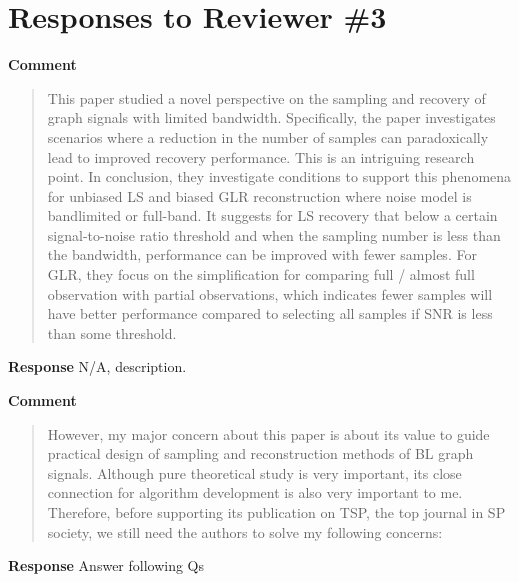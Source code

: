 \documentclass[11pt,onecolumn,journal]{IEEEtran}
\begin{document}
\section*{Responses to Reviewer \#3}
\textbf{Comment}
\begin{quote}
    This paper studied a novel perspective on the sampling and recovery of graph signals with limited bandwidth. Specifically, the paper investigates scenarios where a reduction in the number of samples can paradoxically lead to improved recovery performance. This is an intriguing research point. In conclusion, they investigate conditions to support this phenomena for unbiased LS and biased GLR reconstruction where noise model is bandlimited or full-band.  It suggests for LS recovery that below a certain signal-to-noise ratio threshold and when the sampling number is less than the bandwidth, performance can be improved with fewer samples. For GLR, they focus on the simplification for comparing full / almost full observation with partial observations, which indicates fewer samples will have better performance compared to selecting all samples if SNR is less than some threshold.
\end{quote}
\textbf{Response}
N/A, description.

\textbf{Comment}
\begin{quote}
 However, my major concern about this paper is about its value to guide practical design of sampling and reconstruction methods of BL graph signals. Although pure theoretical study is very important, its close connection for algorithm development is also very important to me.  Therefore, before supporting its publication on TSP, the top journal in SP society, we still need the authors to solve my following concerns:
 \end{quote}
 
\textbf{Response}
Answer following Qs
\end{document}
